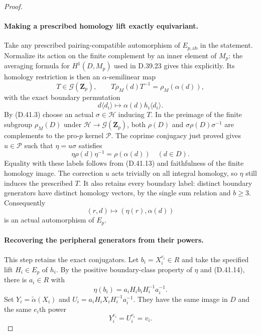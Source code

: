 \begin{proof}
\paragraph{Making a prescribed homology lift exactly equivariant.}
Take any prescribed pairing-compatible
automorphism of \(E_{p,\mathrm{ab}}\)
in the statement.
Normalize its action on the finite
complement by an inner element of \(M_p\):
the averaging formula for \(H^1(D,M_p)\)
used in D.39.23 gives this explicitly.
Its homology restriction is then an
\(\alpha\)-semilinear map
\[
 T\in\mathcal G(\mathbf Z_p),\qquad
 T\rho_M(d)T^{-1}=\rho_M(\alpha(d)),
 \tag{D.41.13}
\]
with the exact boundary permutation
\[
 d\langle d_i\rangle\longmapsto
                \alpha(d)h_i\langle d_i\rangle.
 \tag{D.41.14}
\]
By \textup{(D.41.3)} choose an actual
\(\sigma\in\mathcal H\) inducing \(T\).
In the preimage of the finite subgroup
\(\rho_M(D)\) under
\(\mathcal H\to\mathcal G(\mathbf Z_p)\),
both \(\rho(D)\) and
\(\sigma\rho(D)\sigma^{-1}\)
are complements to the pro-\(p\)
kernel \(\mathcal P\).
The coprime conjugacy just proved
gives \(u\in\mathcal P\) such that
\(\eta=u\sigma\) satisfies
\[
                  \eta\rho(d)\eta^{-1}
                         =\rho(\alpha(d))
                           \quad(d\in D).
 \tag{D.41.15}
\]
Equality with these labels follows
from \textup{(D.41.13)} and faithfulness
of the finite homology image.
The correction \(u\) acts trivially on
all integral homology, so \(\eta\)
still induces the prescribed \(T\).
It also retains every boundary label:
distinct boundary generators have
distinct homology vectors, by the
single sum relation and \(b\geq3\).
Consequently
\[
                   (r,d)\longmapsto
                        (\eta(r),\alpha(d))
 \tag{D.41.16}
\]
is an actual automorphism of \(E_p\).

\paragraph{Recovering the peripheral generators from their powers.}
This step retains the exact conjugators.
Let \(b_i=X_i^{e_i}\in R\) and take
the specified lift \(H_i\in E_p\) of
\(h_i\).
By the positive boundary-class property
of \(\eta\) and \textup{(D.41.14)},
there is \(a_i\in R\) with
\[
       \eta(b_i)=a_iH_i b_iH_i^{-1}a_i^{-1}.
 \tag{D.41.17}
\]
Set \(Y_i=\widetilde\alpha(X_i)\) and
\(U_i=a_iH_i X_iH_i^{-1}a_i^{-1}\).
They have the same image in \(D\) and
the same \(e_i\)th power
\[
                        Y_i^{e_i}=U_i^{e_i}=v_i.
 \tag{D.41.18}
\]


\end{proof}
